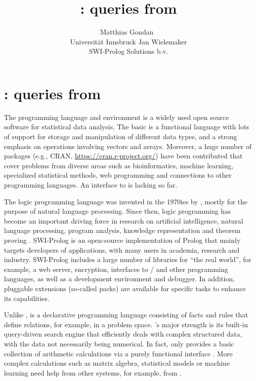 \documentclass[article]{jss}
\author{Matthias Gondan~\orcidlink{0000-0001-9974-0057}\\Universit\"at Innsbruck
   \And Jan Wielemaker\\SWI-Prolog Solutions b.v.}
\title{\pkg{rolog}: \proglang{Prolog} queries from \proglang{R}}
\begin{document}


\section[rolog: Prolog queries from R]{:  queries from }
\label{sec:intro}

The  \citep{R} programming language and environment is a widely used
open source software for statistical data analysis. The basic  is a
functional language with lots of support for storage and manipulation of
different data types, and a strong emphasis on operations involving vectors and
arrays. Moreover, a huge number of
packages (e.g., CRAN, \url{https://cran.r-project.org/}) have been contributed
that cover problems from diverse areas such as bioinformatics, machine learning,
specialized statistical methods, web programming and connections to other
programming languages. An interface to  is lacking so far.

The logic programming language  was invented in the 1970ies 
by \citet{Colmerauer1996}, mostly for the purpose of natural language 
processing. Since then, logic programming has become an important driving force
in research on artificial intelligence, natural language processing, program
analysis, knowledge representation and theorem
proving \citep{Shoham1994,Lally2011,Carro2004,Hsiang1987}.  
SWI-Prolog \citep{Wielemaker2012} is an open-source implementation of Prolog
that mainly targets developers of applications, with many users in academia,
research and industry. SWI-Prolog includes a large number of libraries
for ``the real world'', for example, a web server, encryption, interfaces
to / and other programming languages, as well as a
development environment and debugger. In addition, pluggable 
extensions (so-called packs) are available for specific tasks to enhance its
capabilities.

Unlike ,  is a declarative programming language
consisting of facts and rules that define relations, for example, in a problem
space. 's major strength is its built-in query-driven search
engine that efficiently deals with complex structured data, with the data not
necessarily being numerical. In fact,  only provides a basic
collection of arithmetic calculations via a purely functional
interface . More complex calculations such as matrix
algebra, statistical models or machine learning need help from other systems,
for example, from .
\end{document}
